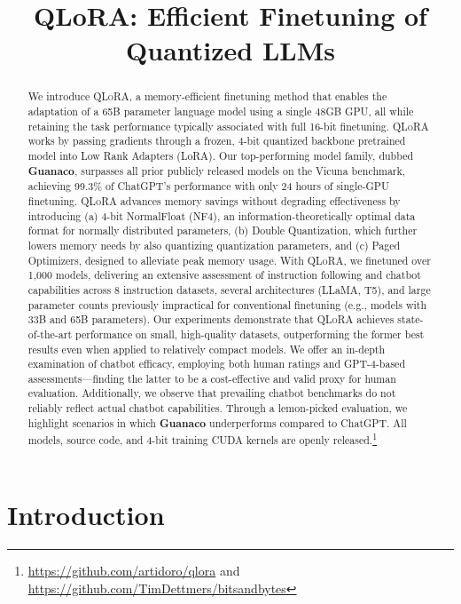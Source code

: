 \title{QLoRA: Efficient Finetuning of Quantized LLMs}

\begin{abstract}
We introduce \textsc{QLoRA}, a memory-efficient finetuning method that enables the adaptation of a 65B parameter language model using a single 48GB GPU, all while retaining the task performance typically associated with full 16-bit finetuning. \textsc{QLoRA} works by passing gradients through a frozen, 4-bit quantized backbone pretrained model into Low Rank Adapters (LoRA). Our top-performing model family, dubbed \textbf{Guanaco}, surpasses all prior publicly released models on the Vicuna benchmark, achieving 99.3\% of ChatGPT’s performance with only 24 hours of single-GPU finetuning. \textsc{QLoRA} advances memory savings without degrading effectiveness by introducing (a) 4-bit NormalFloat (NF4), an information-theoretically optimal data format for normally distributed parameters, (b) Double Quantization, which further lowers memory needs by also quantizing quantization parameters, and (c) Paged Optimizers, designed to alleviate peak memory usage. With \textsc{QLoRA}, we finetuned over 1,000 models, delivering an extensive assessment of instruction following and chatbot capabilities across 8 instruction datasets, several architectures (LLaMA, T5), and large parameter counts previously impractical for conventional finetuning (e.g., models with 33B and 65B parameters). Our experiments demonstrate that \textsc{QLoRA} achieves state-of-the-art performance on small, high-quality datasets, outperforming the former best results even when applied to relatively compact models. We offer an in-depth examination of chatbot efficacy, employing both human ratings and GPT-4-based assessments—finding the latter to be a cost-effective and valid proxy for human evaluation. Additionally, we observe that prevailing chatbot benchmarks do not reliably reflect actual chatbot capabilities. Through a lemon-picked evaluation, we highlight scenarios in which \textbf{Guanaco} underperforms compared to ChatGPT. All models, source code, and 4-bit training CUDA kernels are openly released.\footnote{\url{https://github.com/artidoro/qlora} and \url{https://github.com/TimDettmers/bitsandbytes}}
\end{abstract}

\section{Introduction}


